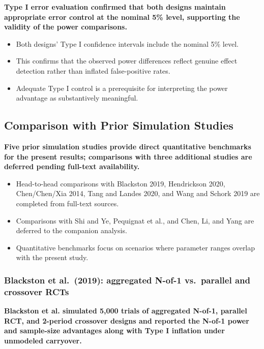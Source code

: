 \documentclass[
  11pt,
]{article}
\begin{document}
\textbf{Type I error evaluation confirmed that both designs maintain appropriate error control at the nominal 5\% level, supporting the validity of the power comparisons.}

\begin{itemize}\setlength{\itemsep}{2pt}\setlength{\parskip}{0pt}
\item Both designs' Type I confidence intervals include the nominal 5\% level.
\item This confirms that the observed power differences reflect genuine effect detection rather than inflated false-positive rates.
\item Adequate Type I control is a prerequisite for interpreting the power advantage as substantively meaningful.
\end{itemize}

\subsection{Comparison with Prior Simulation Studies}\label{comparison-with-prior-simulation-studies}

\textbf{Five prior simulation studies provide direct quantitative benchmarks for the present results; comparisons with three additional studies are deferred pending full-text availability.}

\begin{itemize}\setlength{\itemsep}{2pt}\setlength{\parskip}{0pt}
\item Head-to-head comparisons with Blackston 2019, Hendrickson 2020, Chen/Chen/Xia 2014, Tang and Landes 2020, and Wang and Schork 2019 are completed from full-text sources.
\item Comparisons with Shi and Ye, Pequignat et al., and Chen, Li, and Yang are deferred to the companion analysis.
\item Quantitative benchmarks focus on scenarios where parameter ranges overlap with the present study.
\end{itemize}

\subsubsection{Blackston et al.~(2019): aggregated N-of-1 vs.~parallel and crossover RCTs}\label{blackston-et-al.-2019-aggregated-n-of-1-vs.-parallel-and-crossover-rcts}

\textbf{Blackston et al. simulated 5,000 trials of aggregated N-of-1, parallel RCT, and 2-period crossover designs and reported the N-of-1 power and sample-size advantages along with Type I inflation under unmodeled carryover.}
\end{document}

